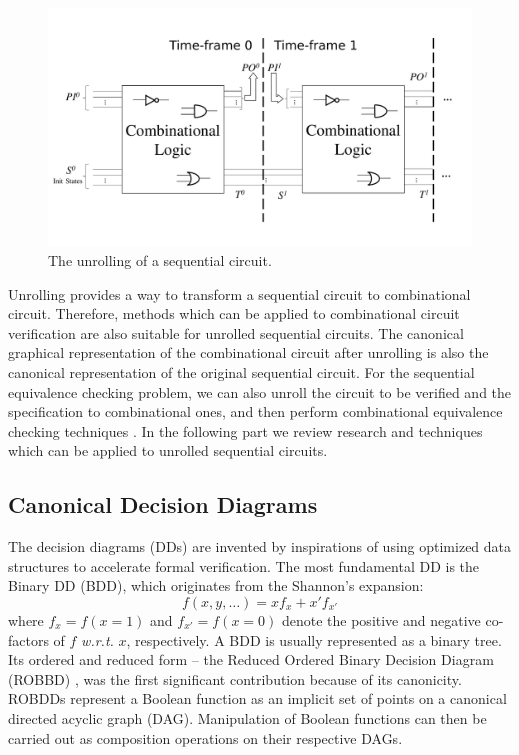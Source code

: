 \begin{figure}[h]
\centerline{
\includegraphics[width=\textwidth]{newfig/unroll.pdf}
}
\caption{The unrolling of a sequential circuit.}
\label{fig:unrolling}
\end{figure}

Unrolling provides a way to transform a sequential circuit to combinational 
circuit. Therefore,  methods which can be applied to combinational circuit 
verification are also suitable for unrolled sequential circuits. The canonical 
graphical representation of the combinational circuit after unrolling is also 
the canonical representation of the original sequential circuit. For the sequential 
equivalence checking problem, we can also unroll the circuit to be verified and the 
specification to combinational ones, and then perform combinational equivalence checking
techniques \cite{savoj2010combinational}. In the following part we review research and techniques which 
can be applied to unrolled sequential circuits.

\subsection{Canonical Decision Diagrams}
The decision diagrams (DDs) are invented by inspirations of 
using optimized data structures to accelerate formal verification.
The most fundamental DD is the Binary DD (BDD), which originates from the 
Shannon's expansion:
\begin{equation}
f(x, y, \dots) = x f_x + x' f_{x'}
\end{equation}
where $f_x = f(x = 1)$ and $f_{x'} = f(x = 0)$ denote the positive and
negative co-factors of $f$ {\it w.r.t.} $x$, respectively.
A BDD is usually represented as a binary tree.
Its ordered and reduced form -- the Reduced Ordered Binary Decision Diagram (ROBBD)
\cite{BRYA86}, was the first significant contribution because of its canonicity.  
 ROBDDs represent a Boolean function as an
implicit set of points on a canonical directed acyclic graph
(DAG). Manipulation of Boolean functions can then be carried out as
composition operations on their respective DAGs. 

